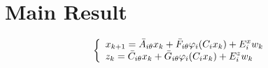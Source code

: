 \documentclass[conference]{IEEEtran}
\begin{document}




\section{Main Result}
 

\begin{equation}\notag
\left\{
\begin{array}{lr}
\begin{split}
x_{k+1}=\bar{A}_{i\theta}x_k+\bar{F}_{i\theta}\varphi_{i}(C_ix_k)+E_i^xw_k\\
\end{split}
\\
\begin{split}
z_k=\bar{C}_{i\theta}x_k+\bar{G}_{i\theta}\varphi_{i}(C_ix_k)+E^z_iw_k
\end{split}
\end{array}
\right.
\end{equation} 
\end{document}
